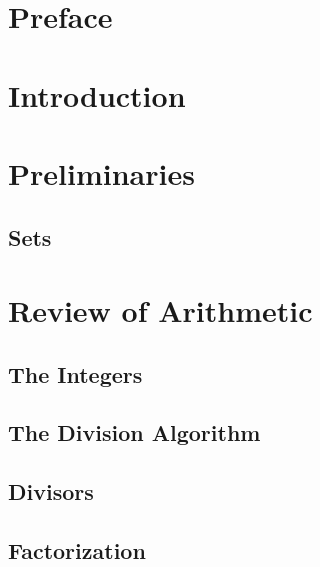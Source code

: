 \documentclass{memoir}
\begin{document}
\frontmatter%
  

  
    \newpage

  \tableofcontents%
  \chapter{Preface}
    

  \chapter{Introduction}
    

  \chapter{Preliminaries}
    \section{Sets}
      


\mainmatter
  \setcounter{chapter}{-1}

  \chapter{Review of Arithmetic}
    \label{chap:arithmetic}
    
    \newpage

    \section{The Integers}
      \label{sec:the-integers}
      
      \newpage

    \section{The Division Algorithm}
      \label{sec:div-alg}
      
      \newpage

    \section{Divisors}
      \label{sec:int-div}
      
      \newpage

    \section{Factorization}
      \label{sec:int-factor}
      
      \newpage
\end{document}
